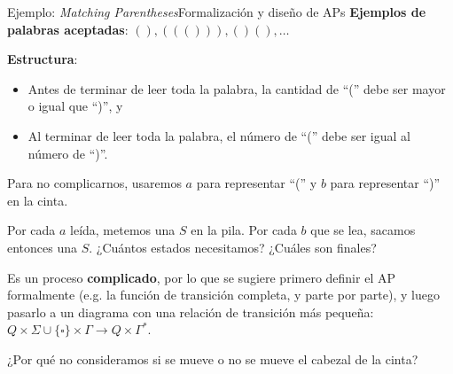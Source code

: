 \documentclass[spanish]{beamer}
\begin{document}
\begin{frame}{Ejemplo: \textit{Matching Parentheses}}{Formalización y diseño de APs}
    \textbf{Ejemplos de palabras aceptadas}: $(), ((())), ()(), \dots$ \pause

    \textbf{Estructura}:
    \begin{itemize}
        \item Antes de terminar de leer toda la palabra, la cantidad de ``('' debe ser mayor o igual que ``)'', y \pause
        \item Al terminar de leer toda la palabra, el número de ``('' debe ser igual al número de ``)''. \pause
    \end{itemize}

    Para no complicarnos, usaremos $a$ para representar ``('' y $b$ para representar ``)'' en la cinta. \pause

    \bigskip
    
    Por cada $a$ leída, metemos una $S$ en la pila. \pause
    Por cada $b$ que se lea, sacamos entonces una $S$.  \pause
    ¿Cuántos estados necesitamos? ¿Cuáles son finales? \pause

    Es un proceso \textbf{complicado}, por lo que se sugiere primero definir el AP formalmente (e.g. la función de transición completa, y parte por parte), y luego pasarlo a un diagrama con una relación de transición más pequeña: $Q \times \Sigma \cup \{\square\} \times \Gamma  \to Q \times \Gamma^*$.
    
    ¿Por qué no consideramos si se mueve o no se mueve el cabezal de la cinta?
\end{frame}
\end{document}
